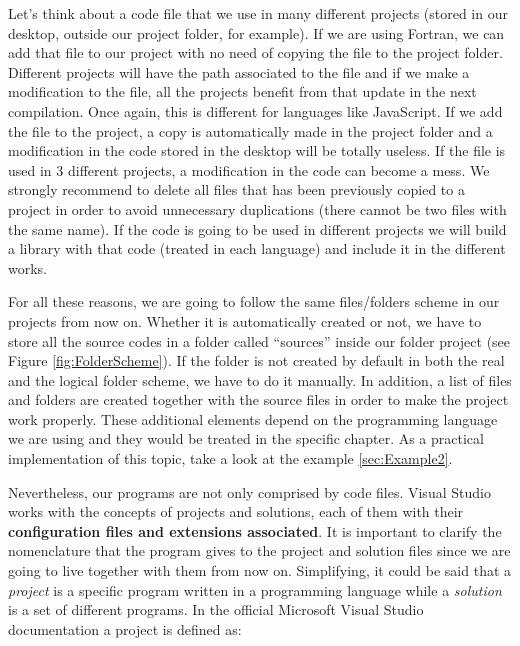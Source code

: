 Let's think about a code file that we use in many different projects (stored in our desktop, outside our project folder, for example). If we are using Fortran, we can add that file to our project with no need of copying the file to the project folder. Different projects will have the path associated to the file and if we make a modification to the file, all the projects benefit from that update in the next compilation. Once again, this is different for languages like JavaScript. If we add the file to the project, a copy is automatically made in the project folder and a modification in the code stored in the desktop will be totally useless. If the file is used in 3 different projects, a modification in the code can become a mess. We strongly recommend to delete all files that has been previously copied to a project in order to avoid unnecessary duplications (there cannot be two files with the same name). If the code is going to be used in different projects we will build a library with that code (treated in each language) and include it in the different works.

\begin{IN}
    For all these reasons, we are going to follow the same files/folders scheme in our projects from now on. Whether it is automatically created or not, we have to store all the source codes in a folder called ``sources'' inside our folder project (see Figure \ref{fig:FolderScheme}). If the folder is not created by default in both the real and the logical folder scheme, we have to do it manually. In addition, a list of files and folders are created together with the source files in order to make the project work properly. These additional elements depend on the programming language we are using and they would be treated in the specific chapter. As a practical implementation of this topic, take a look at the example \ref{sec:Example2}.
\end{IN}

Nevertheless, our programs are not only comprised by code files. Visual Studio works with the concepts of projects and solutions, each of them with their \textbf{configuration files and extensions associated}. It is important to clarify the nomenclature that the program gives to the project and solution files since we are going to live together with them from now on. Simplifying, it could be said that a \textit{project} is a specific program written in a programming language while a \textit{solution} is a set of different programs. In the official Microsoft Visual Studio documentation a project is defined as:

